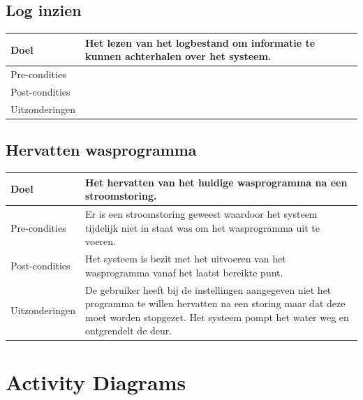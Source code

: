 \subsection{Log inzien}
\begin{center}
  \begin{tabular}{ | p{4cm} | p{8.5cm} | }    \hline
    Doel & Het lezen van het logbestand om informatie te kunnen achterhalen over het systeem. \\ \hline
    Pre-condities & \\ \hline
    Post-condities & \\ \hline
    Uitzonderingen &  \\
    \hline
  \end{tabular}
\end{center}

\subsection{Hervatten wasprogramma}
\begin{center}
  \begin{tabular}{ | p{4cm} | p{8.5cm} | }    \hline
    Doel & Het hervatten van het huidige wasprogramma na een stroomstoring. \\ \hline
    Pre-condities & Er is een stroomstoring geweest waardoor het systeem tijdelijk niet in staat was om het wasprogramma uit te voeren. \\ \hline
    Post-condities & Het systeem is bezit met het uitvoeren van het wasprogramma vanaf het laatst bereikte punt. \\ \hline
    Uitzonderingen & De gebruiker heeft bij de instellingen aangegeven niet het programma te willen hervatten na een storing maar dat deze moet worden stopgezet. Het systeem pompt het water weg en ontgrendelt de deur. \\
    \hline
  \end{tabular}
\end{center}

\section{Activity Diagrams}
